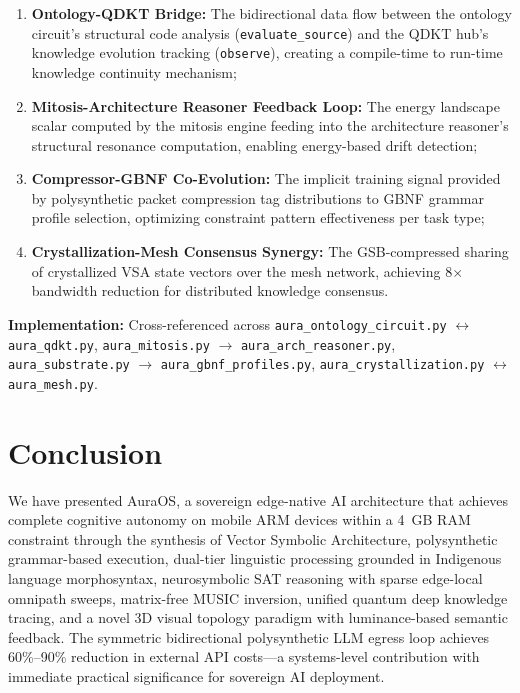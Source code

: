 \documentclass[11pt]{article}
\begin{document}
\begin{enumerate}[label=(\alph*)]
    \item \textbf{Ontology-QDKT Bridge:} The bidirectional data flow between the ontology circuit's structural code analysis (\texttt{evaluate\_source}) and the QDKT hub's knowledge evolution tracking (\texttt{observe}), creating a compile-time to run-time knowledge continuity mechanism;
    \item \textbf{Mitosis-Architecture Reasoner Feedback Loop:} The energy landscape scalar computed by the mitosis engine feeding into the architecture reasoner's structural resonance computation, enabling energy-based drift detection;
    \item \textbf{Compressor-GBNF Co-Evolution:} The implicit training signal provided by polysynthetic packet compression tag distributions to GBNF grammar profile selection, optimizing constraint pattern effectiveness per task type;
    \item \textbf{Crystallization-Mesh Consensus Synergy:} The GSB-compressed sharing of crystallized VSA state vectors over the mesh network, achieving 8$\times$ bandwidth reduction for distributed knowledge consensus.
\end{enumerate}

\textbf{Implementation:} Cross-referenced across \texttt{aura\_ontology\_circuit.py} $\leftrightarrow$ \texttt{aura\_qdkt.py}, \texttt{aura\_mitosis.py} $\rightarrow$ \texttt{aura\_arch\_reasoner.py}, \texttt{aura\_substrate.py} $\rightarrow$ \texttt{aura\_gbnf\_profiles.py}, \texttt{aura\_crystallization.py} $\leftrightarrow$ \texttt{aura\_mesh.py}.

\section{Conclusion}

We have presented AuraOS, a sovereign edge-native AI architecture that achieves complete cognitive autonomy on mobile ARM devices within a 4~GB RAM constraint through the synthesis of Vector Symbolic Architecture, polysynthetic grammar-based execution, dual-tier linguistic processing grounded in Indigenous language morphosyntax, neurosymbolic SAT reasoning with sparse edge-local omnipath sweeps, matrix-free MUSIC inversion, unified quantum deep knowledge tracing, and a novel 3D visual topology paradigm with luminance-based semantic feedback. The symmetric bidirectional polysynthetic LLM egress loop achieves 60\%--90\% reduction in external API costs—a systems-level contribution with immediate practical significance for sovereign AI deployment.
\end{document}
